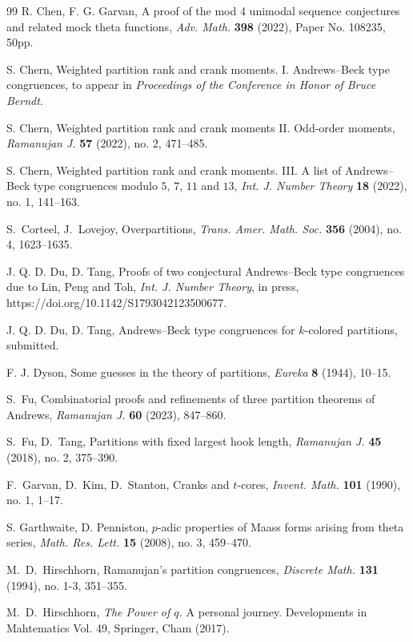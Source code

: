 \documentclass[12pt,reqno]{amsart}
\numberwithin{equation}{section}
\theoremstyle{plain}
\theoremstyle{definition}
\begin{document}
\begin{thebibliography}{99}
R. Chen, F. G. Garvan,
A proof of the mod 4 unimodal sequence conjectures and related mock theta functions,
\textit{Adv. Math.} \textbf{398} (2022), Paper No. 108235, 50pp.


S. Chern, Weighted partition rank and crank moments. I.
Andrews--Beck type congruences, to appear in
\textit{Proceedings of the Conference in Honor of Bruce Berndt}.


S. Chern,
Weighted partition rank and crank moments II. Odd-order moments,
\textit{Ramanujan J.} \textbf{57} (2022), no. 2, 471--485.


S. Chern,
Weighted partition rank and crank moments. III. A list of Andrews--Beck type
congruences modulo $5$, $7$, $11$ and $13$,
\textit{Int. J. Number Theory} \textbf{18} (2022), no. 1, 141--163.


S.~Corteel, J.~Lovejoy,
Overpartitions,
\textit{Trans. Amer. Math. Soc.} \textbf{356} (2004), no. 4, 1623--1635.


J. Q. D. Du, D. Tang,
Proofs of two conjectural Andrews--Beck type congruences due to Lin, Peng and Toh,
\textit{Int. J. Number Theory}, in press, https://doi.org/10.1142/S1793042123500677.


J. Q. D. Du, D. Tang,
Andrews--Beck type congruences for $k$-colored partitions, submitted.


F. J. Dyson,
Some guesses in the theory of partitions,
\textit{Eureka} \textbf{8} (1944), 10--15.


S.~Fu, Combinatorial proofs and refinements of three partition theorems of Andrews,
\textit{Ramanujan J.} \textbf{60} (2023), 847--860.


S.~Fu, D.~Tang,
Partitions with fixed largest hook length,
\textit{Ramanujan J.} \textbf{45} (2018), no. 2, 375--390.


F.~Garvan, D.~Kim, D.~Stanton,
Cranks and $t$-cores,
\textit{Invent. Math.} \textbf{101} (1990), no. 1, 1--17.


S. Garthwaite, D. Penniston,
$p$-adic properties of Maass forms arising from theta series,
\textit{Math. Res. Lett.} \textbf{15} (2008), no. 3, 459--470.


M.~D.~Hirschhorn,
Ramanujan's partition congruences,
\textit{Discrete Math.} \textbf{131} (1994), no. 1-3, 351--355.


M.~D.~Hirschhorn,
\textit{The Power of $q$.} A personal journey.
Developments in Mahtematics Vol. 49, Springer, Cham (2017).



\end{thebibliography}
\end{document}
